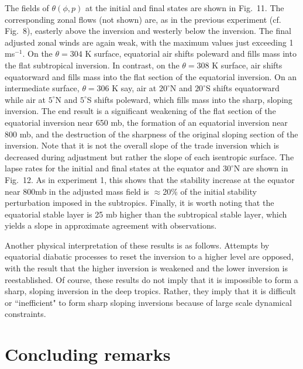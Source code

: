     The fields of $\theta(\phi,p)$ at the initial and final states are shown
in Fig.~11. The corresponding zonal flows (not shown) are, as in the previous
experiment (cf. Fig.~8), easterly above the inversion and westerly below the
inversion. The final adjusted zonal winds are again weak, with the maximum
values just exceeding 1 ms$^{-1}$.  On the $\theta=304$ K surface, equatorial
air shifts poleward and fills mass into the flat subtropical inversion.  In
contrast, on the $\theta=308$ K surface, air shifts equatorward and fills mass
into the flat section of the equatorial inversion. On an intermediate surface,
$\theta=306$ K say, air at $20^\circ$N and $20^\circ$S shifts equatorward
while air at $5^\circ$N and $5^\circ$S shifts poleward, which fills mass into
the sharp, sloping inversion.  The end result is a significant weakening of
the flat section of the equatorial inversion near 650 mb, the formation of an
equatorial inversion near 800 mb, and the destruction of the sharpness of the
original sloping section of the inversion.  Note that it is not the overall
slope of the trade inversion which is decreased during adjustment but rather
the slope of each isentropic surface. The lapse rates for the initial and
final
states at the equator and $30^\circ$N are shown in Fig.~12. As in  experiment
1, this shows that the stability increase at the equator near 800mb in the
adjusted mass field is $\approx$20\% of the initial stability perturbation
imposed in the subtropics.  Finally, it is worth noting that the equatorial
stable layer is 25 mb higher than the subtropical stable layer, which yields a
slope in approximate agreement with observations.

     Another physical interpretation of these results is as follows.
Attempts by equatorial diabatic processes to reset the inversion to a higher
level are opposed, with the result that the higher inversion is weakened and
the lower inversion is reestablished.  Of course, these results do not imply
that it is impossible to form a sharp, sloping inversion in the deep tropics. 
Rather, they imply that it is difficult or ``inefficient" to form sharp
sloping inversions because of large scale dynamical constraints.

\vfill
\eject

\section{Concluding remarks}

